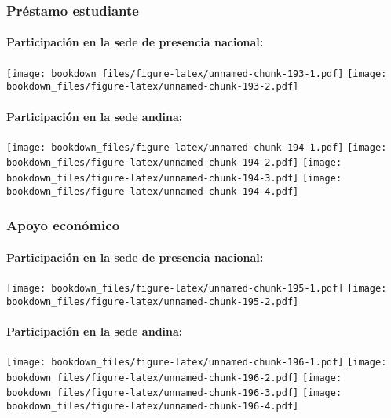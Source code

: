 \documentclass[]{article}
\let\oldparagraph\paragraph
\renewcommand{\paragraph}[1]{\oldparagraph{#1}\mbox{}}
\theoremstyle{definition}
\theoremstyle{definition}
\theoremstyle{definition}
\theoremstyle{remark}
\begin{document}
\subsubsection{Préstamo estudiante}\label{prestamo-estudiante-1}

\paragraph{Participación en la sede de presencia
nacional:}\label{participacion-en-la-sede-de-presencia-nacional-13}

\texttt{[image: bookdown\_files/figure-latex/unnamed-chunk-193-1.pdf]}
\texttt{[image: bookdown\_files/figure-latex/unnamed-chunk-193-2.pdf]}

\paragraph{Participación en la sede
andina:}\label{participacion-en-la-sede-andina-13}

\texttt{[image: bookdown\_files/figure-latex/unnamed-chunk-194-1.pdf]}
\texttt{[image: bookdown\_files/figure-latex/unnamed-chunk-194-2.pdf]}
\texttt{[image: bookdown\_files/figure-latex/unnamed-chunk-194-3.pdf]}
\texttt{[image: bookdown\_files/figure-latex/unnamed-chunk-194-4.pdf]}

\subsubsection{Apoyo económico}\label{apoyo-economico-1}

\paragraph{Participación en la sede de presencia
nacional:}\label{participacion-en-la-sede-de-presencia-nacional-14}

\texttt{[image: bookdown\_files/figure-latex/unnamed-chunk-195-1.pdf]}
\texttt{[image: bookdown\_files/figure-latex/unnamed-chunk-195-2.pdf]}

\paragraph{Participación en la sede
andina:}\label{participacion-en-la-sede-andina-14}

\texttt{[image: bookdown\_files/figure-latex/unnamed-chunk-196-1.pdf]}
\texttt{[image: bookdown\_files/figure-latex/unnamed-chunk-196-2.pdf]}
\texttt{[image: bookdown\_files/figure-latex/unnamed-chunk-196-3.pdf]}
\texttt{[image: bookdown\_files/figure-latex/unnamed-chunk-196-4.pdf]}
\end{document}
